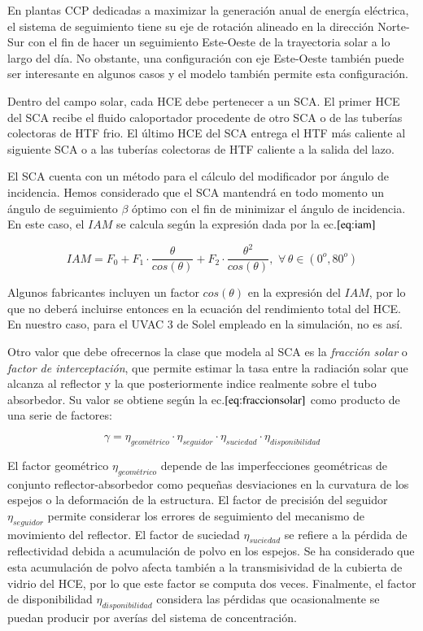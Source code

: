 En plantas CCP dedicadas a maximizar la generación anual de energía eléctrica, el sistema de seguimiento tiene su eje de rotación alineado en la dirección Norte-Sur con el fin de hacer un seguimiento Este-Oeste de la trayectoria solar a lo largo del día. No obstante, una configuración con eje Este-Oeste también puede ser interesante en algunos casos y el modelo también permite esta configuración.

Dentro del campo solar, cada HCE debe pertenecer a un SCA. El primer HCE del SCA recibe el fluido caloportador procedente de otro SCA o de las tuberías colectoras de HTF frio. El último HCE del SCA entrega el HTF más caliente al siguiente SCA o a las tuberías colectoras de HTF caliente a la salida del lazo.

El SCA cuenta con un método para el cálculo del modificador por ángulo de incidencia. Hemos considerado que el SCA mantendrá en todo momento un ángulo de seguimiento \(\beta\) óptimo con el fin de minimizar el ángulo de incidencia. En este caso, el \(IAM\) se calcula según la expresión dada por la ec.\(\eqref{eq:iam}\)

\begin{equation}
   IAM = F_0 + F_1 \cdot \frac{\theta}{cos(\theta)} + F_2 \cdot \frac{\theta^2}{cos(\theta)},\,\, \forall  \,
 \theta \in (0^o, 80^o)
    \label{eq:iam}
\end{equation}

Algunos fabricantes incluyen un factor \(cos(\theta)\) en la expresión del \(IAM\), por lo que no deberá incluirse entonces en la ecuación del rendimiento total del HCE. En nuestro caso, para el UVAC 3 de Solel empleado en la simulación, no es así.

Otro valor que debe ofrecernos la clase que modela al SCA es la \textit{fracción solar} o \textit{factor de interceptación}, que permite estimar la tasa entre la radiación solar que alcanza al reflector y la que posteriormente indice realmente sobre el tubo absorbedor. Su valor se obtiene según la ec.\(\eqref{eq:fraccionsolar}\) como producto de una serie de factores: 

\begin{equation}
   \gamma = \eta_{geométrico} \cdot \eta_{seguidor} \cdot \eta_{suciedad} \cdot \eta_{disponibilidad}
    \label{eq:fraccionsolar}
\end{equation}

El factor geométrico \(\eta_{geométrico}\) depende de las imperfecciones geométricas de conjunto reflector-absorbedor como pequeñas desviaciones en la curvatura de los espejos o la deformación de la estructura. El factor de precisión del seguidor \(\eta_{seguidor}\) permite considerar los errores de seguimiento del mecanismo de movimiento del reflector. El factor de suciedad \(\eta_{suciedad}\) se refiere a la pérdida de reflectividad debida a acumulación de polvo en los espejos. Se ha considerado que esta acumulación de polvo afecta también a la transmisividad de la cubierta de vidrio del HCE, por lo que este factor se computa dos veces. Finalmente, el factor de disponibilidad \(\eta_{disponibilidad}\) considera las pérdidas que ocasionalmente se puedan producir por averías del sistema de concentración.

